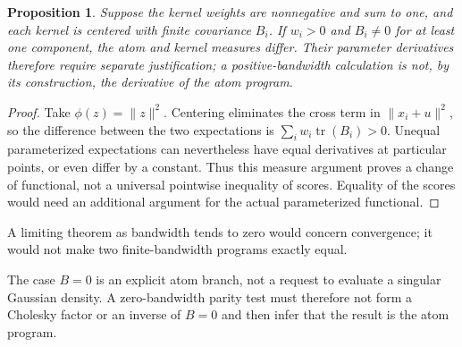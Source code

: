 \documentclass[11pt]{article}
\newtheorem{proposition}{Proposition}
\begin{document}
\begin{proposition}
Suppose the kernel weights are nonnegative and sum to one, and each kernel
is centered with finite covariance $B_i$. If $w_i>0$ and $B_i\ne0$ for at
least one component, the atom and kernel measures differ. Their parameter
derivatives therefore require separate justification; a positive-bandwidth
calculation is not, by its construction, the derivative of the atom program.
\end{proposition}

\begin{proof}
Take $\phi(z)=\|z\|^2$. Centering eliminates the cross term in
$\|x_i+u\|^2$, so the difference between the two expectations is
$\sum_i w_i\operatorname{tr}(B_i)>0$. Unequal parameterized expectations
can nevertheless have equal derivatives at particular points, or even differ
by a constant. Thus this measure argument proves a change of functional, not
a universal pointwise inequality of scores. Equality of the scores would need
an additional argument for the actual parameterized functional.
\end{proof}

A limiting theorem as bandwidth tends to zero would concern convergence;
it would not make two finite-bandwidth programs exactly equal.

The case $B=0$ is an explicit atom branch, not a request to evaluate a
singular Gaussian density.  A zero-bandwidth parity test must therefore not
form a Cholesky factor or an inverse of $B=0$ and then infer that the result is
the atom program.
\end{document}
